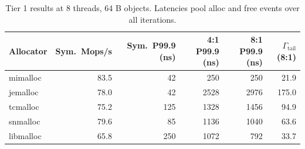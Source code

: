 \begin{table}[!htbp]
\centering
\footnotesize
\setlength{\tabcolsep}{3pt}
\caption{Tier 1 results at 8 threads, 64 B objects. Latencies pool alloc and free events over all iterations.}
\label{tab:tier1}
\begin{tabular}{lrrrrr}
\toprule
Allocator & Sym.\ Mops/s & Sym.\ P99.9 (ns) & 4:1 P99.9 (ns) & 8:1 P99.9 (ns) & $\Gamma_{\mathrm{tail}}$ (8:1)\\
\midrule
mimalloc & 83.5 & 42 & 250 & 250 & 21.9 \\
jemalloc & 78.0 & 42 & 2528 & 2976 & 175.0 \\
tcmalloc & 75.2 & 125 & 1328 & 1456 & 94.9 \\
snmalloc & 79.6 & 85 & 1136 & 1040 & 63.6 \\
libmalloc & 65.8 & 250 & 1072 & 792 & 33.7 \\
\bottomrule
\end{tabular}
\end{table}
